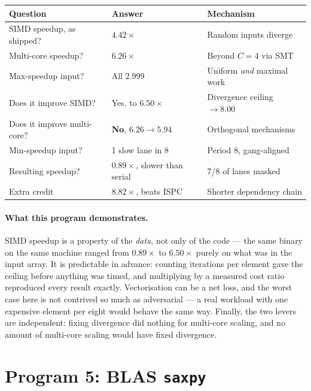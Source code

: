 \documentclass[11pt,a4paper]{article}
\begin{document}
\begin{table}[H]
\centering
\begin{tabular}{lll}
\toprule
Question & Answer & Mechanism \\
\midrule
SIMD speedup, as shipped?   & $4.42\times$  & Random inputs diverge \\
Multi-core speedup?         & $6.26\times$  & Beyond $C{=}4$ via SMT \\
Max-speedup input?          & All $2.999$   & Uniform \emph{and} maximal work \\
Does it improve SIMD?       & Yes, to $6.50\times$ & Divergence ceiling $\to 8.00$ \\
Does it improve multi-core? & \textbf{No}, $6.26 \to 5.94$ & Orthogonal mechanisms \\
Min-speedup input?          & 1 slow lane in 8 & Period 8, gang-aligned \\
Resulting speedup?          & $\mathbf{0.89\times}$, slower than serial & 7/8 of lanes masked \\
Extra credit                & $8.82\times$, beats ISPC & Shorter dependency chain \\
\bottomrule
\end{tabular}
\end{table}

\paragraph{What this program demonstrates.} SIMD speedup is a property of the
\emph{data}, not only of the code --- the same binary on the same machine ranged
from $0.89\times$ to $6.50\times$ purely on what was in the input array. It is
predictable in advance: counting iterations per element gave the ceiling before
anything was timed, and multiplying by a measured cost ratio reproduced every
result exactly. Vectorisation can be a net loss, and the worst case here is not
contrived so much as adversarial --- a real workload with one expensive element
per eight would behave the same way. Finally, the two levers are independent:
fixing divergence did nothing for multi-core scaling, and no amount of
multi-core scaling would have fixed divergence.


\section{Program 5: BLAS \texttt{saxpy}}
\label{sec:prog5}
\end{document}
